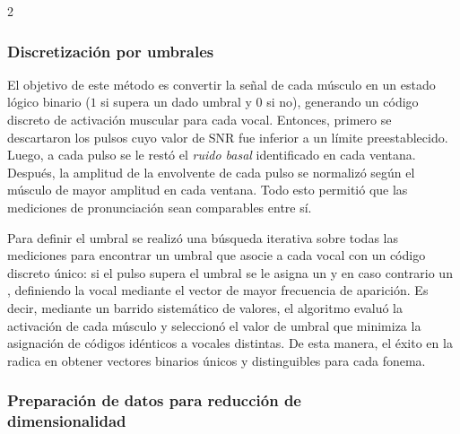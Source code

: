 \documentclass[11pt, letterpaper]{article}
\begin{document}
\begin{multicols*}{2}
\subsubsection*{Discretización por umbrales}

El objetivo de este método es convertir la señal de cada músculo en un estado lógico binario ($1$ si supera un dado umbral y $0$ si no), generando un código discreto de activación muscular para cada vocal. Entonces, primero se descartaron los pulsos cuyo valor de SNR fue inferior a un límite preestablecido. Luego, a cada pulso se le restó el \textit{ruido basal} identificado en cada ventana. Después, la amplitud de la envolvente de cada pulso se normalizó según el músculo de mayor amplitud en cada ventana. Todo esto permitió que las mediciones de pronunciación sean comparables entre sí. 

Para definir el umbral se realizó una búsqueda iterativa sobre todas las mediciones para encontrar un umbral que asocie a cada vocal con un código discreto único: si el pulso supera el umbral se le asigna un  y en caso contrario un , definiendo la vocal mediante el vector de mayor frecuencia de aparición. Es decir, mediante un barrido sistemático de valores, el algoritmo evaluó la activación de cada músculo y seleccionó el valor de umbral que minimiza la asignación de códigos idénticos a vocales distintas. De esta manera, el éxito en la  radica en obtener vectores binarios únicos y distinguibles para cada fonema.

\subsubsection*{Preparación de datos para reducción de\\dimensionalidad}


\end{multicols*}
\end{document}
